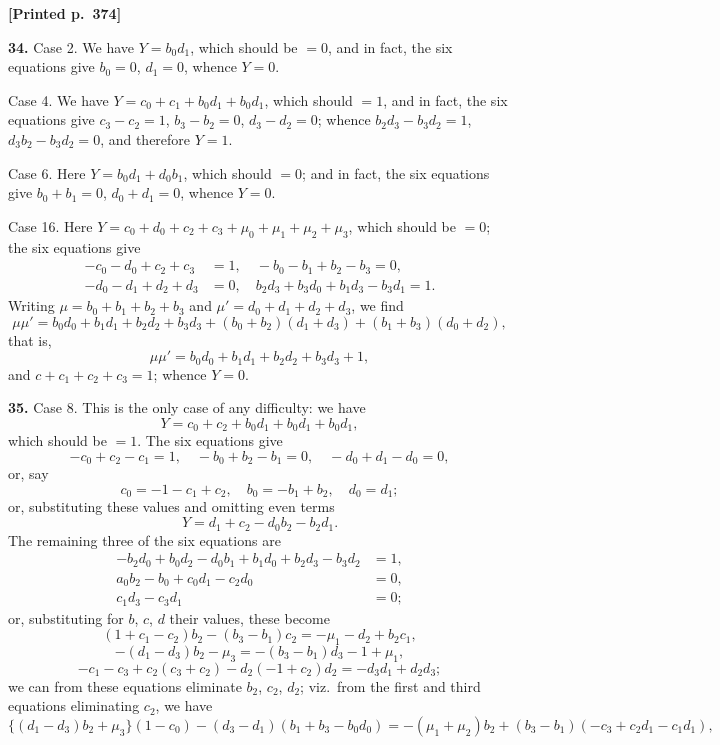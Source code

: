\documentclass[11pt]{article}
\begin{document}
\medskip
\noindent\textbf{[Printed p.~374]}\hfill

\medskip
\noindent\textbf{34.} Case 2. We have $Y=b_{0}d_{1}$, which should be $=0$, and in fact, the six equations give $b_{0}=0$, $d_{1}=0$, whence $Y=0$.

Case 4. We have $Y=c_{0}+c_{1}+b_{0}d_{1}+b_{0}d_{1}$, which should $=1$, and in fact, the six equations give $c_{3}-c_{2}=1$, $b_{3}-b_{2}=0$, $d_{3}-d_{2}=0$; whence $b_{2}d_{3}-b_{3}d_{2}=1$, $d_{3}b_{2}-b_{3}d_{2}=0$, and therefore $Y=1$.

Case 6. Here $Y=b_{0}d_{1}+d_{0}b_{1}$, which should $=0$; and in fact, the six equations give $b_{0}+b_{1}=0$, $d_{0}+d_{1}=0$, whence $Y=0$.

Case 16. Here $Y=c_{0}+d_{0}+c_{2}+c_{3}+\mu_{0}+\mu_{1}+\mu_{2}+\mu_{3}$, which should be $=0$; the six equations give
\begin{align*}
-c_{0}-d_{0}+c_{2}+c_{3} &= 1,\quad -b_{0}-b_{1}+b_{2}-b_{3}=0,\\
-d_{0}-d_{1}+d_{2}+d_{3} &= 0,\quad b_{2}d_{3}+b_{3}d_{0}+b_{1}d_{3}-b_{3}d_{1}=1.
\end{align*}
Writing $\mu=b_{0}+b_{1}+b_{2}+b_{3}$ and $\mu'=d_{0}+d_{1}+d_{2}+d_{3}$, we find
\[
\mu\mu'=b_{0}d_{0}+b_{1}d_{1}+b_{2}d_{2}+b_{3}d_{3}+(b_{0}+b_{2})(d_{1}+d_{3})+(b_{1}+b_{3})(d_{0}+d_{2}),
\]
that is,
\[
\mu\mu'=b_{0}d_{0}+b_{1}d_{1}+b_{2}d_{2}+b_{3}d_{3}+1,
\]
and $c+c_{1}+c_{2}+c_{3}=1$; whence $Y=0$.

\medskip
\noindent\textbf{35.} Case 8. This is the only case of any difficulty: we have
\[
Y=c_{0}+c_{2}+b_{0}d_{1}+b_{0}d_{1}+b_{0}d_{1},
\]
which should be $=1$. The six equations give
\[
-c_{0}+c_{2}-c_{1}=1,\quad -b_{0}+b_{2}-b_{1}=0,\quad -d_{0}+d_{1}-d_{0}=0,
\]
or, say
\[
c_{0}=-1-c_{1}+c_{2},\quad b_{0}=-b_{1}+b_{2},\quad d_{0}=d_{1};
\]
or, substituting these values and omitting even terms
\[
Y=d_{1}+c_{2}-d_{0}b_{2}-b_{2}d_{1}.
\]
The remaining three of the six equations are
\begin{align*}
-b_{2}d_{0}+b_{0}d_{2}-d_{0}b_{1}+b_{1}d_{0}+b_{2}d_{3}-b_{3}d_{2} &= 1,\\
a_{0}b_{2}-b_{0}+c_{0}d_{1}-c_{2}d_{0} &= 0,\\
c_{1}d_{3}-c_{3}d_{1} &= 0;
\end{align*}
or, substituting for $b$, $c$, $d$ their values, these become
\[
(1+c_{1}-c_{2})b_{2}-(b_{3}-b_{1})c_{2}=-\mu_{1}-d_{2}+b_{2}c_{1},
\]
\[
-(d_{1}-d_{3})b_{2}-\mu_{3}=-(b_{3}-b_{1})d_{3}-1+\mu_{1},
\]
\[
-c_{1}-c_{3}+c_{2}(c_{3}+c_{2})-d_{2}(-1+c_{2})d_{2}=-d_{3}d_{1}+d_{2}d_{3};
\]
we can from these equations eliminate $b_{2}$, $c_{2}$, $d_{2}$; viz.\ from the first and third equations eliminating $c_{2}$, we have
\[
\{(d_{1}-d_{3})b_{2}+\mu_{3}\}(1-c_{0})-(d_{3}-d_{1})(b_{1}+b_{3}-b_{0}d_{0})=-(\mu_{1}+\mu_{2})b_{2}+(b_{3}-b_{1})(-c_{3}+c_{2}d_{1}-c_{1}d_{1}),
\]
\end{document}
